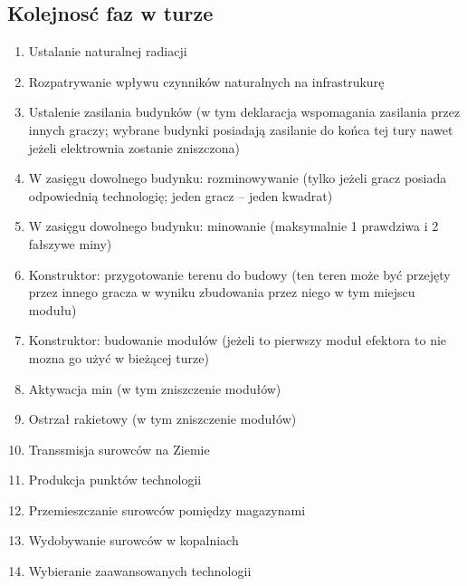 \documentclass[11pt,a4paper]{article}
\begin{document}
\subsection{Kolejnosć faz w turze}

\begin{enumerate}
  \setlength{\parskip}{0pt}
  \setlength{\itemsep}{0pt plus 1pt}
\item Ustalanie naturalnej radiacji
\item Rozpatrywanie wpływu czynników naturalnych na infrastrukurę
\item Ustalenie zasilania budynków (w tym deklaracja wspomagania zasilania przez innych graczy; wybrane budynki posiadają zasilanie do końca tej tury nawet jeżeli elektrownia zostanie zniszczona)
\item W zasięgu dowolnego budynku: rozminowywanie (tylko jeżeli gracz posiada odpowiednią technologię; jeden gracz -- jeden kwadrat)
\item W zasięgu dowolnego budynku: minowanie (maksymalnie 1 prawdziwa i 2 fałszywe miny)
\item Konstruktor: przygotowanie terenu do budowy (ten teren może być przejęty przez innego gracza w wyniku zbudowania przez niego w tym miejscu modułu)
\item Konstruktor: budowanie modułów (jeżeli to pierwszy moduł efektora to nie mozna go użyć w bieżącej turze)
\item Aktywacja min (w tym zniszczenie modułów)
\item Ostrzał rakietowy (w tym zniszczenie modułów)
\item Transsmisja surowców na Ziemie
\item Produkcja punktów technologii
\item Przemieszczanie surowców pomiędzy magazynami
\item Wydobywanie surowców w kopalniach
\item Wybieranie zaawansowanych technologii
\end{enumerate}
\end{document}
